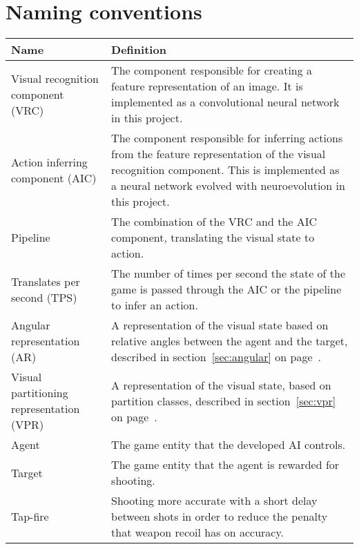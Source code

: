 
\section{Naming conventions}
\label{sec:naming-conventions} 

\begin{table}[H]
\begin{center}

\begin{tabularx}{\textwidth}{ | >{\RaggedRight}p{4.5cm} | X |}
		\hline
	
		\textbf{Name} & \textbf{Definition} \\ \hline
		Visual recognition component (VRC) & The component responsible for creating a feature representation of an image. It is implemented as a convolutional neural network in this project. \\ \hline
		Action inferring component (AIC) & The component responsible for inferring actions from the feature representation of the visual recognition component. This is implemented as a neural network evolved with neuroevolution in this project. \\ \hline
		
		Pipeline & The combination of the VRC and the AIC component, translating the visual state to action. \\ \hline
		
Translates per second (TPS) & The number of times per second the state of the game is passed through the AIC or the pipeline to infer an action.\\ \hline		
		
		Angular representation (AR) & A representation of the visual state based on relative angles between the agent and the target, described in section~\ref{sec:angular} on page~\pageref{sec:angular}. \\ \hline
		
		Visual partitioning representation (VPR) & A representation of the visual state, based on partition classes, described in section~\ref{sec:vpr} on page~\pageref{sec:vpr}. \\ \hline
		
		Agent & The game entity that the developed AI controls. \\ \hline
		Target & The game entity that the agent is rewarded for shooting. \\ \hline
		
		Tap-fire & Shooting more accurate with a short delay between shots in order to reduce the penalty that weapon recoil has on accuracy. \\ \hline
		
		
\end{tabularx}
\end{center}
\end{table}

\newpage